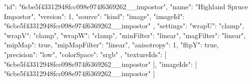 {
  "id": "6cbe5f43312948fcc098e974f6369262__impostor",
  "name": "Highland Spruce Impostor",
  "version": 1,
  "source": {
    "kind": "image",
    "imageId": "6cbe5f43312948fcc098e974f6369262__impostor"
  },
  "settings": {
    "wrapU": "clamp",
    "wrapV": "clamp",
    "wrapW": "clamp",
    "minFilter": "linear",
    "magFilter": "linear",
    "mipMap": true,
    "mipMapFilter": "linear",
    "anisotropy": 1,
    "flipY": true,
    "precision": "low",
    "colorSpace": "srgb"
  },
  "textureIds": [
    "6cbe5f43312948fcc098e974f6369262__impostor"
  ],
  "imageIds": [
    "6cbe5f43312948fcc098e974f6369262__impostor"
  ]
}
